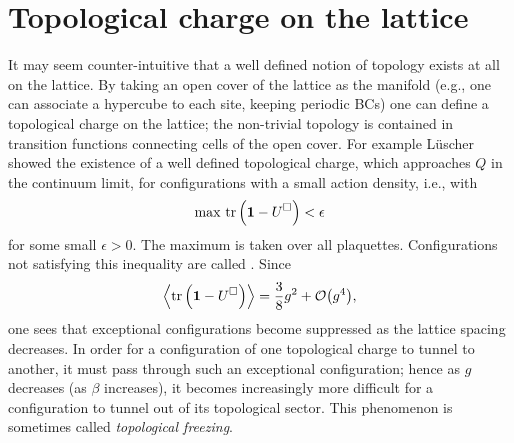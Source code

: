 \section{Topological charge on the lattice}\label{sec:toplat}

It may seem counter-intuitive that a well defined notion of topology
exists at all on the lattice. By taking an open cover of the
lattice as the manifold (e.g., one can associate a hypercube to
each site, keeping periodic BCs) one can define a topological charge on the 
lattice; the non-trivial topology is contained in transition functions
connecting cells of the open cover. For example 
L\"uscher~\cite{luscher_topology_1982} showed
the existence of a well defined topological charge, which approaches 
$Q$ in the continuum limit, for configurations with a small action
density, i.e., with
\begin{equation}
  \max\,\tr\left({\mathbf 1}-U^\Box\right)<\epsilon
\end{equation}
for some small $\epsilon>0$. The maximum is taken over all plaquettes.
Configurations not satisfying this inequality are called 
. 
Since
\begin{equation}
  \ev{\tr\left(\id-U^\Box\right)}=\frac{3}{8}g^2+\order{g^4},
\end{equation} 
one sees that exceptional configurations become suppressed 
as the lattice spacing
decreases. In order for a configuration of one topological charge to
tunnel to another, it must pass through such an exceptional configuration;
hence as $g$ decreases (as $\beta$ increases), it becomes increasingly 
more difficult for a configuration to tunnel out of its topological sector. 
This phenomenon is sometimes called {\it topological freezing}.

